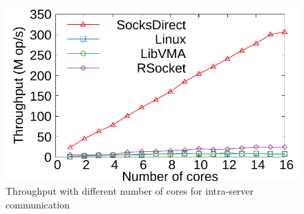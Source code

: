 \begin{figure}[htpb]
	\centering
	\includegraphics[width=\columnwidth]{eval/microbenchmark/corenum-IPC-tput.pdf}
	\caption{Throughput with different number of cores for intra-server communication}
	\label{fig:eval-cornum-ipc}
\end{figure}

